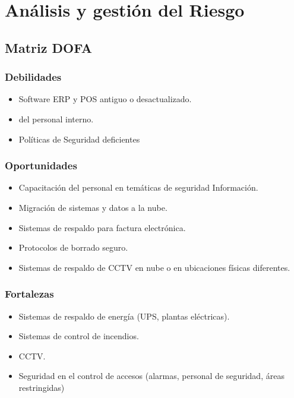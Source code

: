\newpage
{}
\section{\large Análisis y gestión del Riesgo}

\subsection{Matriz DOFA} 

\subsubsection{Debilidades}
\begin{itemize}
    \item Software ERP y POS antiguo o desactualizado.
    \item  del personal interno.
    \item Políticas de Seguridad deficientes
\end{itemize}

\subsubsection{Oportunidades}
\begin{itemize}
\item Capacitación del personal en temáticas de seguridad Información.
\item Migración de sistemas y datos a la nube.
\item Sistemas de respaldo para factura electrónica.
\item Protocolos de borrado seguro.
\item Sistemas de respaldo de CCTV en nube o en ubicaciones físicas diferentes.
\end{itemize}

\subsubsection{Fortalezas}
\begin{itemize}
\item Sistemas de respaldo de energía (UPS, plantas eléctricas).
\item Sistemas de control de incendios.
\item CCTV.
\item Seguridad en el control de accesos (alarmas, personal de seguridad, áreas restringidas)
\end{itemize}

